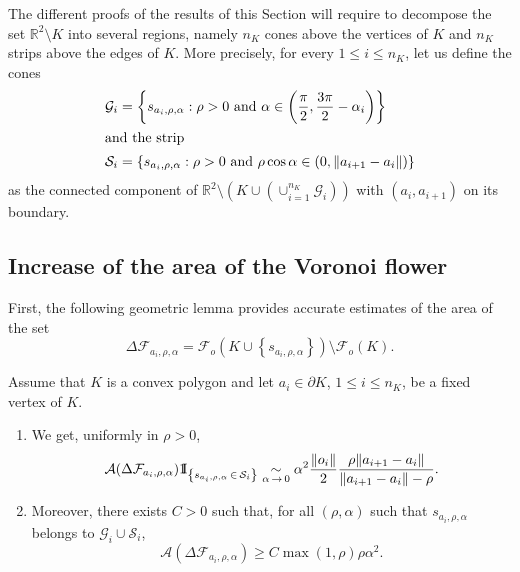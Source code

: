 \documentclass[AHL,Unicode,longabstracts,published]{cedram}
\newcommand{\indicat}{{\text{1}}\negthickspace\text{I}}
\newcommand{\cA}{\mathcal{A}}
\newcommand{\cF}{\mathcal{F}}
\newcommand{\cG}{\mathcal{G}}
\newcommand{\cS}{\mathcal{S}}
\newcommand{\R}{\mathbb{R}}
\newcommand{\pass}{\vspace{0.3cm}\noindent}
\newcommand{\noi}{\noindent}
\newcommand*{\romanenumi}{\renewcommand*{\theenumi}{\roman{enumi}}}
\newcommand{\R}{\mathbb{R}}
\begin{document}
The different proofs of the results of this Section will require to decompose the set $\R^2\setminus K$ into several regions, namely $n_K$ cones above the vertices of $K$ and $n_K$ strips above the edges of $K$. More precisely, for every $1\le i \le n_K$, let us define the cones
\begin{align*}
\cG_i &=\left\{s_{a_i,\rho,\alpha}:\rho>0 \text{ and } \alpha\in\left(\frac{\pi}{2},\frac{3\pi}{2}-\alpha_i\right)\right\}
\\
\intertext{and the strip}
\cS_i &=\left\{s_{a_i,\rho,\alpha}:\rho>0 \text{ and } \rho\cos\alpha\in(0,\|a_{i+1}-a_i\|)\right\}
\end{align*}
as the connected component of $\R^2\setminus (K\cup(\cup_{i=1}^{n_K}\cG_i))$ with $(a_i,a_{i+1})$ on its boundary.


\subsection{Increase of the area of the Voronoi flower}\label{subsec:fleurpoly}


First, the following geometric lemma provides accurate estimates of the area of the set
\begin{equation*}\label{def:diffvorflowpoly}
\Delta\cF_{a_i,\rho,\alpha}=\cF_o(K \cup \left\{s_{a_i,\rho,\alpha}\right\})\setminus\cF_o(K).
\end{equation*}

\begin{lemm}\label{lem:geompoly1}
Assume that $K$ is a convex polygon and let $a_i\in\partial K$, $1\leq i \leq n_K$, be a fixed vertex of $K$.
\begin{enumerate}\romanenumi
\item\label{estimeevolfleurpoly1} We get, uniformly in $\rho>0$,
\[
\cA(\Delta\cF_{a_i,\rho,\alpha})\indicat_{\left\{s_{a_i,\rho,\alpha}\,\in\,\cS_i\right\}}\underset{\alpha\,\to\,0}{\sim} \alpha^2\frac{\|o_i\|}{2}\frac{\rho\|a_{i+1}-a_i\|}{\|a_{i+1}-a_i\|-\rho}.
\]
\item\label{estimeevolfleurpoly2} Moreover, there exists $C>0$ such that, for all $(\rho,\alpha)$ such that $s_{a_i,\rho,\alpha}$ belongs to $\cG_i\cup\cS_i$,
\[
\cA\left(\Delta\cF_{a_i,\rho,\alpha}\right)\ge C\max(1,\rho)\rho\alpha^2.
\]
\end{enumerate}
\end{lemm}
\end{document}

